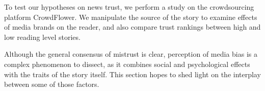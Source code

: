 To test our hypotheses on news trust, we perform a study on the crowdsourcing platform CrowdFlower. We manipulate the source of the story to examine effects of media brands on the reader, and also compare trust rankings between high and low reading level stories.



Although the general consensus of mistrust is clear, perception of media bias is a complex phenomenon to dissect, as it combines social and psychological effects with the traits of the story itself. This section hopes to shed light on the interplay between some of those factors.

%  